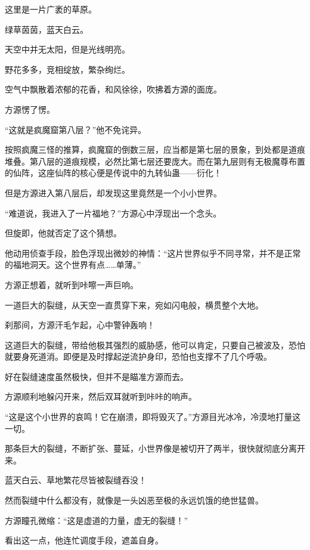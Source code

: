 
\begin{this_body}



这里是一片广袤的草原。

绿草茵茵，蓝天白云。

天空中并无太阳，但是光线明亮。

野花多多，竞相绽放，繁杂绚烂。

空气中飘散着浓郁的花香，和风徐徐，吹拂着方源的面庞。

方源愣了愣。

“这就是疯魔窟第八层？”他不免诧异。

按照疯魔三怪的推算，疯魔窟的倒数三层，应当都是第七层的景象，到处都是道痕堆叠。第八层的道痕规模，必然比第七层还要庞大。而在第九层则有无极魔尊布置的仙阵，这座仙阵的核心便是传说中的九转仙蛊——衍化！

但是方源进入第八层后，却发现这里竟然是一个小小世界。

“难道说，我进入了一片福地？”方源心中浮现出一个念头。

但旋即，他就否定了这个猜想。

他动用侦查手段，脸色浮现出微妙的神情：“这片世界似乎不同寻常，并不是正常的福地洞天。这个世界有点……单薄。”

方源正想着，就听到咔嚓一声巨响。

一道巨大的裂缝，从天空一直贯穿下来，宛如闪电般，横贯整个大地。

刹那间，方源汗毛乍起，心中警钟轰响！

这道巨大的裂缝，带给他极其强烈的威胁感，他可以肯定，只要自己被波及，恐怕就要身死道消。即便是及时撑起逆流护身印，恐怕也支撑不了几个呼吸。

好在裂缝速度虽然极快，但并不是瞄准方源而去。

方源顺利地躲闪开来，然后双耳就听到咔咔的响声。

“这是这个小世界的哀鸣！它在崩溃，即将毁灭了。”方源目光冰冷，冷漠地打量这一切。

那条巨大的裂缝，不断扩张、蔓延，小世界像是被切开了两半，很快就彻底分离开来。

蓝天白云、草地繁花尽皆被裂缝吞没！

然而裂缝中什么都没有，就像是一头凶恶至极的永远饥饿的绝世猛兽。

方源瞳孔微缩：“这是虚道的力量，虚无的裂缝！”

看出这一点，他连忙调度手段，遮盖自身。


\end{this_body}
